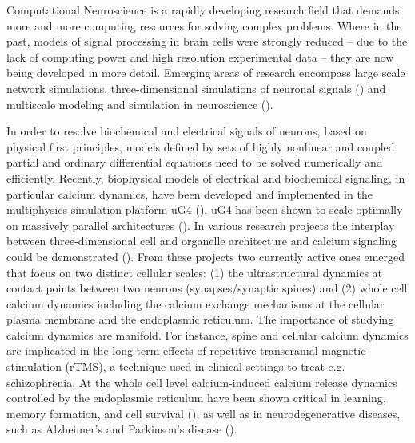 Computational Neuroscience is a rapidly developing research field that demands more and more computing resources for solving complex problems. Where in the past, models of signal processing in brain cells were strongly reduced -- due to the lack of computing power and high resolution experimental data -- they are now being developed in more detail. Emerging areas of research encompass large scale network simulations, three-dimensional simulations of neuronal signals (\cite{Xylouris2007, Xylouris2012, Breit2016, Breit2018, Breit2018b}) and multiscale modeling and simulation in neuroscience (\cite{Stepniewski2019b}).

In order to resolve biochemical and electrical signals of neurons, based on physical first principles, models defined by sets of highly nonlinear and coupled partial and ordinary differential equations need to be solved numerically and efficiently. Recently, biophysical models of electrical and biochemical signaling, in particular calcium dynamics, have been developed and implemented in the multiphysics simulation platform uG4 (\cite{Vogel2013}). uG4 has been shown to scale optimally on massively parallel architectures (\cite{Reiter12}). In various research projects the interplay between three-dimensional cell and organelle architecture and calcium signaling could be demonstrated (\cite{Grein14, Wittmann2009, Queisser11, Knodel2014, Breit2018, Breit2018b}). From these projects two currently active ones emerged that focus on two distinct cellular scales: (1) the ultrastructural dynamics at contact points between two neurons (synapses/synaptic spines) and (2) whole cell calcium dynamics including the calcium exchange mechanisms at the cellular plasma membrane and the endoplasmic reticulum. The importance of studying calcium dynamics are manifold. For instance, spine and cellular calcium dynamics are implicated in the long-term effects of repetitive transcranial magnetic stimulation (rTMS), a technique used in clinical settings to treat e.g. schizophrenia. At the whole cell level calcium-induced calcium release dynamics controlled by the endoplasmic reticulum have been shown critical in learning, memory formation, and cell survival (\cite{West2002, Milner1998, Bading2000, Hardingham1997}), as well as in neurodegenerative diseases, such as Alzheimer's and Parkinson's disease (\cite{Bezprozvanny2009, Chan2009, Cheung2008, Green2008}). 

